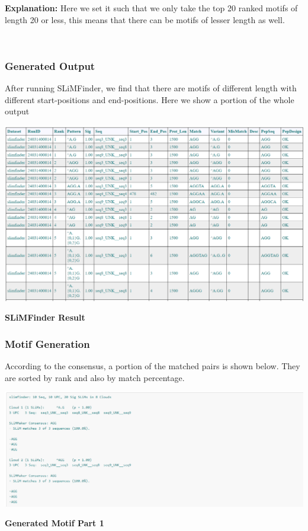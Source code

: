 \textbf{Explanation: }Here we set it such that we only take the top 20 ranked motifs of length 20 or less, this means that there can be motifs of lesser length as well.

\\


\subsubsection{Generated Output}
After running SLiMFinder, we find that there are motifs of different length with different start-positions and end-positions. Here we show a portion of the whole output

\vspace{8pt}
\begin{center}
\includegraphics[width=14cm]{images/output2.png}
\end{center}
\begin{center}
\textbf{SLiMFinder Result}
\end{center}
\vspace{8pt}

\subsubsection{Motif Generation}

According to the consensus, a portion of the matched pairs is shown below. They are sorted by rank and also by match percentage. 

\vspace{8pt}
\begin{center}
\includegraphics[width=14cm]{images/cloud1.png}
\end{center}
\begin{center}
\textbf{Generated Motif Part 1}
\end{center}
\vspace{8pt}

